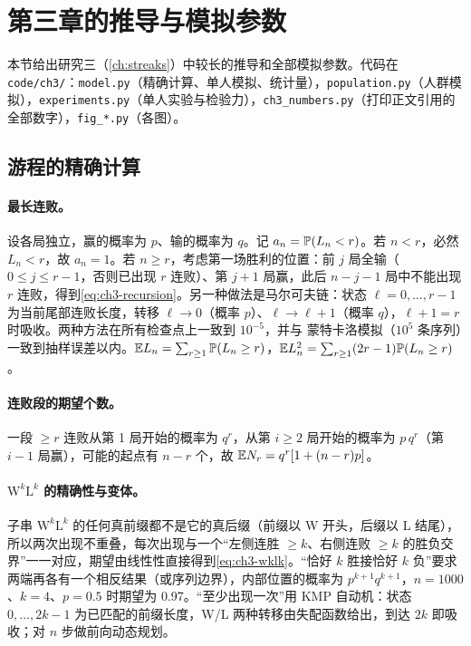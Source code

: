 \section{第三章的推导与模拟参数}
\label{app:ch3}

本节给出研究三（\cref{ch:streaks}）中较长的推导和全部模拟参数。代码在 \texttt{code/ch3/}：\texttt{model.py}（精确计算、单人模拟、统计量），\texttt{population.py}（人群模拟），\texttt{experiments.py}（单人实验与检验力），\texttt{ch3\_numbers.py}（打印正文引用的全部数字），\texttt{fig\_*.py}（各图）。

\subsection{游程的精确计算}
\label{app:ch3-runs}

\paragraph{最长连败。} 设各局独立，赢的概率为 $p$、输的概率为 $q$。记 $a_n=\mathbb{P}(L_n<r)$。若 $n<r$，必然 $L_n<r$，故 $a_n=1$。若 $n\ge r$，考虑第一场胜利的位置：前 $j$ 局全输（$0\le j\le r-1$，否则已出现 $r$ 连败）、第 $j+1$ 局赢，此后 $n-j-1$ 局中不能出现 $r$ 连败，得到\cref{eq:ch3-recursion}。另一种做法是马尔可夫链：状态 $\ell=0,\dots,r-1$ 为当前尾部连败长度，转移 $\ell\to0$（概率 $p$）、$\ell\to\ell+1$（概率 $q$），$\ell+1=r$ 时吸收。两种方法在所有检查点上一致到 $10^{-5}$，并与 蒙特卡洛模拟（$10^5$ 条序列）一致到抽样误差以内。$\mathbb{E} L_n=\sum_{r\ge1}\mathbb{P}(L_n\ge r)$，$\mathbb{E} L_n^2=\sum_{r\ge1}(2r-1)\mathbb{P}(L_n\ge r)$。

\paragraph{连败段的期望个数。} 一段 $\ge r$ 连败从第 1 局开始的概率为 $q^r$，从第 $i\ge2$ 局开始的概率为 $p\,q^r$（第 $i-1$ 局赢），可能的起点有 $n-r$ 个，故 $\mathbb{E} N_r=q^r[1+(n-r)p]$。

\paragraph{$\mathrm W^k\mathrm L^k$ 的精确性与变体。} 子串 $\mathrm W^k\mathrm L^k$ 的任何真前缀都不是它的真后缀（前缀以 W 开头，后缀以 L 结尾），所以两次出现不重叠，每次出现与一个“左侧连胜 $\ge k$、右侧连败 $\ge k$ 的胜负交界”一一对应，期望由线性性直接得到\cref{eq:ch3-wklk}。“恰好 $k$ 胜接恰好 $k$ 负”要求两端再各有一个相反结果（或序列边界），内部位置的概率为 $p^{k+1}q^{k+1}$，$n=1000$、$k=4$、$p=0.5$ 时期望为 0.97。“至少出现一次”用 KMP 自动机：状态 $0,\dots,2k-1$ 为已匹配的前缀长度，W/L 两种转移由失配函数给出，到达 $2k$ 即吸收；对 $n$ 步做前向动态规划。

